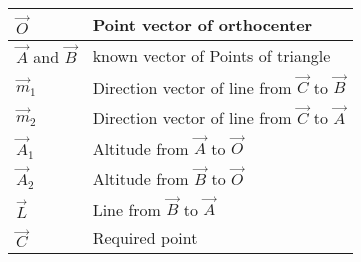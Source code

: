 \begin{table}[H]
    \centering
    \begin{tabular}{|l|l|}
    \hline
      $\vec{O}$   & Point vector of orthocenter \\
      \hline
      $\vec{A}$ and $\vec{B}$   & known vector of Points of triangle\\
      \hline
      $\vec{m}_1$ & Direction vector of line from $\vec{C}$ to $\vec{B}$\\
      \hline
      $\vec{m}_2$ & Direction vector of line from $\vec{C}$ to $\vec{A}$\\
      \hline
      $\vec{A}_1$ & Altitude from $\vec{A}$ to $\vec{O}$\\
      \hline
      $\vec{A}_2$ & Altitude from $\vec{B}$ to $\vec{O}$\\
      \hline
      $\vec{L}$ & Line from $\vec{B}$ to $\vec{A}$\\
      \hline
      $\vec{C}$ & Required point\\
      \hline
    \end{tabular}
    \caption{}
    \label{tab:tables/table.tex}
\end{table}